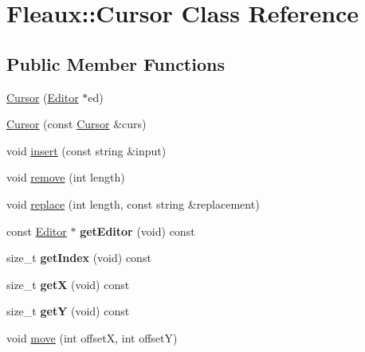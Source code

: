 \hypertarget{classFleaux_1_1Cursor}{}\section{Fleaux\+:\+:Cursor Class Reference}
\label{classFleaux_1_1Cursor}
\subsection*{Public Member Functions}
\begin{DoxyCompactItemize}
\item 
\hyperlink{classFleaux_1_1Cursor_aa2811c8ebadd1b019a1d1099eb401e3b}{Cursor} (\hyperlink{classFleaux_1_1Editor}{Editor} $\ast$ed)
\item 
\hyperlink{classFleaux_1_1Cursor_af6415626e9f343334e527bad5b97407f}{Cursor} (const \hyperlink{classFleaux_1_1Cursor}{Cursor} \&curs)
\item 
void \hyperlink{classFleaux_1_1Cursor_a99c820ad3d952b5e38a41a11c18e7c2f}{insert} (const string \&input)
\item 
void \hyperlink{classFleaux_1_1Cursor_a0fca52d6d4e589f8eef50a351e8340ff}{remove} (int length)
\item 
void \hyperlink{classFleaux_1_1Cursor_a439606f718dd885f4f96ca3244c3172a}{replace} (int length, const string \&replacement)
\item 
\hypertarget{classFleaux_1_1Cursor_a1a3278733bdf619b044bac300ceb48bb}{}const \hyperlink{classFleaux_1_1Editor}{Editor} $\ast$ {\bfseries get\+Editor} (void) const \label{classFleaux_1_1Cursor_a1a3278733bdf619b044bac300ceb48bb}

\item 
\hypertarget{classFleaux_1_1Cursor_a7358d0be48db3117802279959c125eb8}{}size\+\_\+t {\bfseries get\+Index} (void) const \label{classFleaux_1_1Cursor_a7358d0be48db3117802279959c125eb8}

\item 
\hypertarget{classFleaux_1_1Cursor_a3dc9befeb121b6a536da063560f81af0}{}size\+\_\+t {\bfseries get\+X} (void) const \label{classFleaux_1_1Cursor_a3dc9befeb121b6a536da063560f81af0}

\item 
\hypertarget{classFleaux_1_1Cursor_ab265ba6839087cbe810c27fe59e9f593}{}size\+\_\+t {\bfseries get\+Y} (void) const \label{classFleaux_1_1Cursor_ab265ba6839087cbe810c27fe59e9f593}

\item 
void \hyperlink{classFleaux_1_1Cursor_a91e3ff97154764836099fdb13002c877}{move} (int offset\+X, int offset\+Y)
\end{DoxyCompactItemize}


